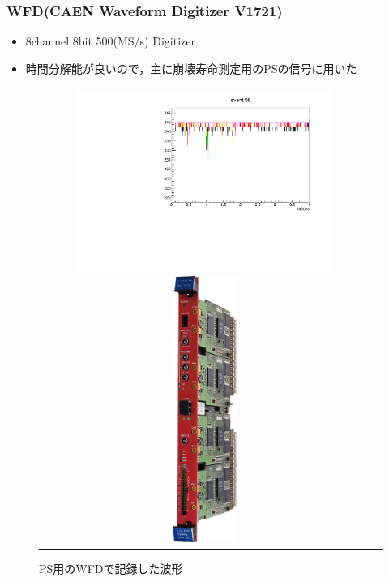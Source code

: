 \subsubsection{WFD(CAEN Waveform Digitizer V1721)}
  \begin{itemize}
    \item 8channel 8bit 500(MS/s) Digitizer
    \item 時間分解能が良いので，主に崩壊寿命測定用のPSの信号に用いた
  \end{itemize}
  \begin{figure}[H]
    \begin{tabular}{cc}
      \begin{minipage}{0.5\hsize}
        \centering
        \includegraphics[width=0.8\textwidth,angle=-90]{figure/hayakawa/ps_plot.pdf}
        \caption{PS用のWFDで記録した波形}
      \end{minipage}
      \begin{minipage}{0.4\hsize}
        \centering
        \includegraphics[width=0.2\textwidth]{figure/hayakawa/1095_L.jpg}
      \end{minipage}
    \end{tabular}
  \end{figure}




